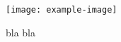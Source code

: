 \documentclass{beamer}
\begin{document}
\begin{frame}
    \begin{figure}
        \texttt{[image: example-image]}
        \caption{bla bla}
    \end{figure}
\end{frame}
\end{document}
